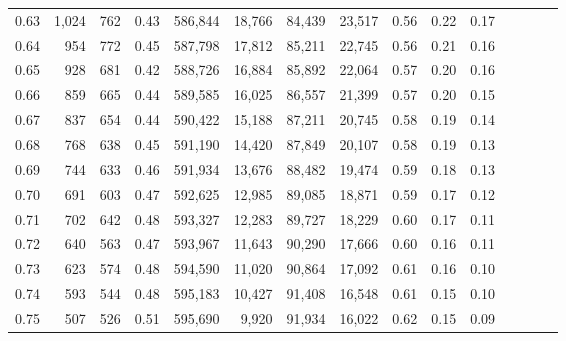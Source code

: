\begin{tabular}{rrrcrrrrrrrrrrr}
0.63 &   1,024 &    762 &                                       0.43 &  586,844 &   18,766 &   84,439 &   23,517 &  0.56 &  0.22 &                         0.17 \\
0.64 &     954 &    772 &                                       0.45 &  587,798 &   17,812 &   85,211 &   22,745 &  0.56 &  0.21 &                         0.16 \\
0.65 &     928 &    681 &                                       0.42 &  588,726 &   16,884 &   85,892 &   22,064 &  0.57 &  0.20 &                         0.16 \\
0.66 &     859 &    665 &                                       0.44 &  589,585 &   16,025 &   86,557 &   21,399 &  0.57 &  0.20 &                         0.15 \\
0.67 &     837 &    654 &                                       0.44 &  590,422 &   15,188 &   87,211 &   20,745 &  0.58 &  0.19 &                         0.14 \\
0.68 &     768 &    638 &                                       0.45 &  591,190 &   14,420 &   87,849 &   20,107 &  0.58 &  0.19 &                         0.13 \\
0.69 &     744 &    633 &                                       0.46 &  591,934 &   13,676 &   88,482 &   19,474 &  0.59 &  0.18 &                         0.13 \\
0.70 &     691 &    603 &                                       0.47 &  592,625 &   12,985 &   89,085 &   18,871 &  0.59 &  0.17 &                         0.12 \\
0.71 &     702 &    642 &                                       0.48 &  593,327 &   12,283 &   89,727 &   18,229 &  0.60 &  0.17 &                         0.11 \\
0.72 &     640 &    563 &                                       0.47 &  593,967 &   11,643 &   90,290 &   17,666 &  0.60 &  0.16 &                         0.11 \\
0.73 &     623 &    574 &                                       0.48 &  594,590 &   11,020 &   90,864 &   17,092 &  0.61 &  0.16 &                         0.10 \\
0.74 &     593 &    544 &                                       0.48 &  595,183 &   10,427 &   91,408 &   16,548 &  0.61 &  0.15 &                         0.10 \\
0.75 &     507 &    526 &                                       0.51 &  595,690 &    9,920 &   91,934 &   16,022 &  0.62 &  0.15 &                         0.09 \\

\end{tabular}
